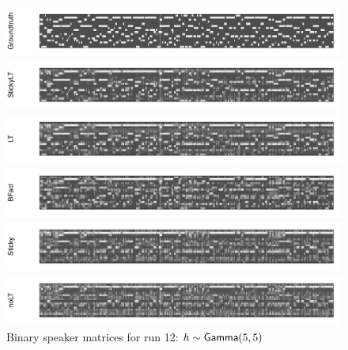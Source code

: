 \begin{figure}[tb]
\begin{center}
  \centerline{\includegraphics[width = \textwidth, height = 0.2\textwidth]{fig/cocktail/synth_s16_m12/hyper_h/h10.0_nocs_cp0/a5b5/groundtruth.pdf}}
  \centerline{\includegraphics[width = \textwidth, height = 0.2\textwidth]{fig/cocktail/synth_s16_m12/hyper_h/h10.0_nocs_cp0/a5b5/StickyLT_hdp_hmm_w0_ah5_bh5/binary_state.pdf}}
  \centerline{\includegraphics[width = \textwidth, height = 0.2\textwidth]{fig/cocktail/synth_s16_m12/hyper_h/h10.0_nocs_cp0/a5b5/LT_hdp_hmm_w0_ah5_bh5/binary_state.pdf}}
  \centerline{\includegraphics[width = \textwidth, height = 0.2\textwidth]{fig/cocktail/synth_s16_m12/hyper_h/h10.0_nocs_cp0/a5b5/BFact_hmm_w0_ah5_bh5/binary_state.pdf}}
  \centerline{\includegraphics[width = \textwidth, height = 0.2\textwidth]{fig/cocktail/synth_s16_m12/hyper_h/h10.0_nocs_cp0/a5b5/Sticky_hdp_hmm_w0_ah5_bh5/binary_state.pdf}}
  \centerline{\includegraphics[width = \textwidth, height = 0.2\textwidth]{fig/cocktail/synth_s16_m12/hyper_h/h10.0_nocs_cp0/a5b5/noLT_hdp_hmm_w0_ah5_bh5/binary_state.pdf}}
\caption{Binary speaker matrices for run 12: $h \sim \mathsf{Gamma}(5,5)$}
\end{center}
\end{figure}

